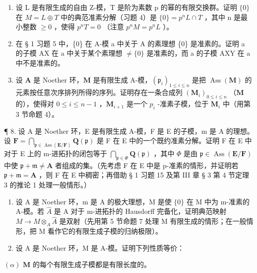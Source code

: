 \begin{enumerate}
\def\labelenumi{\arabic{enumi}.}
\setcounter{enumi}{4}
\item
  设 L 是有限生成的自由 Z-模，T 是阶为素数 p 的幂的有限交换群。证明 \(\{0\}\) 在 \(M = L \oplus T\) 中的典范准素分解（习题 4）是 \(\{0\} = p^{n}L \cap T\) ，其中 n 是最小整数 \(\geqslant 0\) ，使得 \(p^{n}T = 0\) （注意 \(p^{n}M = p^{n}L\) ）。
\item
  在 § 1 习题 5 中，\{0\} 在 A-模 a 中关于 A 的素理想 \{0\} 是准素的。证明 a 的子模 AX 在 a 中关于某个素理想 \(\neq\{0\}\) 是准素的，而 a 的子模 AXY 在 a 中不是准素的。
\item
  设 \(\mathbf{A}\) 是 Noether 环，\(\mathbf{M}\) 是有限生成 A-模，\((\mathfrak{p}_i)_{1\leqslant i\leqslant n}\) 是把 \(\operatorname {Ass}(\mathbf{M})\) 的元素按任意次序排列所得的序列。证明存在一条合成列 \((\mathbf{M}_i)_{0\leqslant i\leqslant n}\) （\(\mathbf{M}\) 的），使得对 \(0\leqslant i\leqslant n - 1\) ，\(\mathbf{M}_{i + 1}\) 是一个 \(p_i\) -准素子模，位于 \(\mathbf{M}_i\) 中（用第 3 节命题 4）。
\end{enumerate}

¶ 8. 设 A 是 Noether 环，E 是有限生成 A-模，F 是 E 的子模，m 是 A 的理想。设 \(\mathbf{F} = \bigcap_{\mathfrak{p} \in \operatorname{Ass}(\mathbf{E}/\mathbf{F})} \mathbf{Q}(\mathfrak{p})\) 是 F 在 E 中的一个既约准素分解。证明 F 在 E 中对于 E 上的 m-进拓扑的闭包等于 \(\bigcap_{\mathfrak{p} \in \Phi} \mathbf{Q}(\mathfrak{p})\) ，其中 \(\Phi\) 是由 \(\mathfrak{p} \in \operatorname{Ass}(\mathbf{E}/\mathbf{F})\) 中使 \(\mathfrak{p} + \mathfrak{m} \neq \mathbf{A}\) 者组成的集。（先考虑 F 在 E 中是 p-准素的情形，并证明若 \(\mathfrak{p} + \mathfrak{m} = \mathbf{A}\) ，则 F 在 E 中稠密；再借助 § 1 习题 15 及第 III 章 § 3 第 4 节定理 3 的推论 1 处理一般情形。）

\begin{enumerate}
\def\labelenumi{\arabic{enumi}.}
\setcounter{enumi}{8}
\item
  设 A 是 Noether 环，m 是 A 的极大理想，M 是使 \(\{0\}\) 在 M 中为 m-准素的 A-模。若 \(\hat{A}\) 是 A 对于 m-进拓扑的 Hausdorff 完备化，证明典范映射 \(M \to M \otimes_{A} \hat{A}\) 是双射（先用第 5 节命题 7 处理 M 有限生成的情形；在一般情形，把 M 看作它的有限生成子模的归纳极限）。
\item
  设 A 是 Noether 环，M 是 A-模。证明下列性质等价：
\end{enumerate}

\((\alpha)\) \(\mathbf{M}\) 的每个有限生成子模都是有限长度的。

